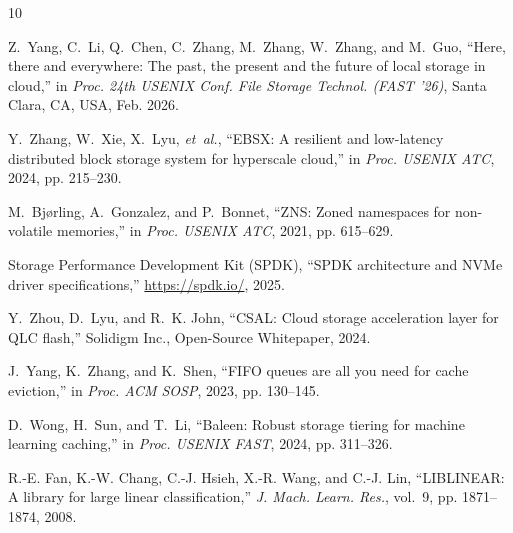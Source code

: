 \documentclass[lettersize,journal]{IEEEtran}
\begin{document}

\begin{thebibliography}{10}

Z.~Yang, C.~Li, Q.~Chen, C.~Zhang, M.~Zhang, W.~Zhang, and M.~Guo,
``Here, there and everywhere: The past, the present and the future of local storage in cloud,''
in \emph{Proc. 24th USENIX Conf. File Storage Technol. (FAST '26)}, Santa Clara, CA, USA, Feb. 2026.

Y.~Zhang, W.~Xie, X.~Lyu, \emph{et~al.},
``EBSX: A resilient and low-latency distributed block storage system for hyperscale cloud,''
in \emph{Proc. USENIX ATC}, 2024, pp. 215--230.

M.~Bj{\o}rling, A.~Gonzalez, and P.~Bonnet,
``ZNS: Zoned namespaces for non-volatile memories,''
in \emph{Proc. USENIX ATC}, 2021, pp. 615--629.

Storage Performance Development Kit (SPDK),
``SPDK architecture and NVMe driver specifications,''
\url{https://spdk.io/}, 2025.

Y.~Zhou, D.~Lyu, and R.~K. John,
``CSAL: Cloud storage acceleration layer for QLC flash,''
Solidigm Inc., Open-Source Whitepaper, 2024.

J.~Yang, K.~Zhang, and K.~Shen,
``FIFO queues are all you need for cache eviction,''
in \emph{Proc. ACM SOSP}, 2023, pp. 130--145.

D.~Wong, H.~Sun, and T.~Li,
``Baleen: Robust storage tiering for machine learning caching,''
in \emph{Proc. USENIX FAST}, 2024, pp. 311--326.

R.-E. Fan, K.-W. Chang, C.-J. Hsieh, X.-R. Wang, and C.-J. Lin,
``LIBLINEAR: A library for large linear classification,''
\emph{J. Mach. Learn. Res.}, vol.~9, pp. 1871--1874, 2008.

\end{thebibliography}
\end{document}

